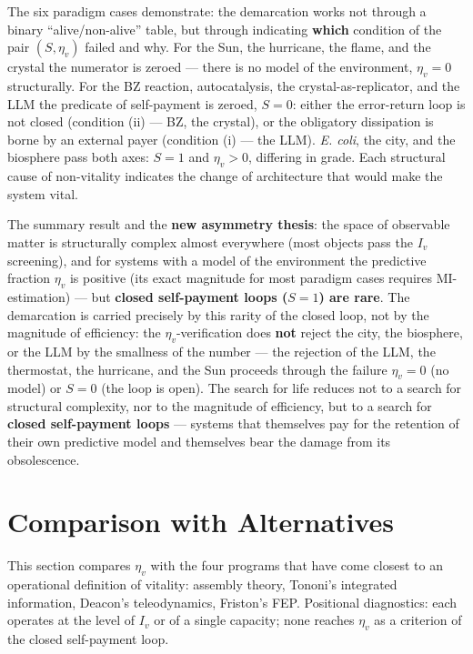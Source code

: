 \documentclass[pdflatex,sn-mathphys-ay]{sn-jnl}
\begin{document}
The six paradigm cases demonstrate: the demarcation works not through a binary ``alive/non-alive'' table, but through indicating \textbf{which} condition of the pair \((S, \eta_v)\) failed and why. For the Sun, the hurricane, the flame, and the crystal the numerator is zeroed --- there is no model of the environment, \(\eta_v = 0\) structurally. For the BZ reaction, autocatalysis, the crystal-as-replicator, and the LLM the predicate of self-payment is zeroed, \(S = 0\): either the error-return loop is not closed (condition (ii) --- BZ, the crystal), or the obligatory dissipation is borne by an external payer (condition (i) --- the LLM). \emph{E. coli}, the city, and the biosphere pass both axes: \(S = 1\) and \(\eta_v > 0\), differing in grade. Each structural cause of non-vitality indicates the change of architecture that would make the system vital.

The summary result and the \textbf{new asymmetry thesis}: the space of observable matter is structurally complex almost everywhere (most objects pass the \(I_v\) screening), and for systems with a model of the environment the predictive fraction \(\eta_v\) is positive (its exact magnitude for most paradigm cases requires MI-estimation) --- but \textbf{closed self-payment loops (\(S = 1\)) are rare}. The demarcation is carried precisely by this rarity of the closed loop, not by the magnitude of efficiency: the \(\eta_v\)-verification does \textbf{not} reject the city, the biosphere, or the LLM by the smallness of the number --- the rejection of the LLM, the thermostat, the hurricane, and the Sun proceeds through the failure \textbf{\(\eta_v = 0\)} (no model) or \textbf{\(S = 0\)} (the loop is open). The search for life reduces not to a search for structural complexity, nor to the magnitude of efficiency, but to a search for \textbf{closed self-payment loops} --- systems that themselves pay for the retention of their own predictive model and themselves bear the damage from its obsolescence.

\section{Comparison with Alternatives}\label{comparison-with-alternatives}

This section compares \(\eta_v\) with the four programs that have come closest to an operational definition of vitality: assembly theory, Tononi's integrated information, Deacon's teleodynamics, Friston's FEP. Positional diagnostics: each operates at the level of \(I_v\) or of a single capacity; none reaches \(\eta_v\) as a criterion of the closed self-payment loop.
\end{document}
